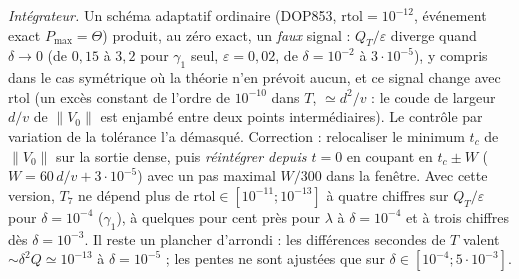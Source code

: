 \documentclass[11pt,a4paper]{article}
\theoremstyle{remark}
\theoremstyle{definition}
\newcommand{\norm}[1]{\lVert #1\rVert}
\newcommand{\eps}{\varepsilon}
\begin{document}
\emph{Intégrateur.} Un schéma adaptatif ordinaire (DOP853, $\mathrm{rtol}=10^{-12}$, événement exact $P_{\max}=\Theta$) produit, au zéro exact, un \emph{faux} signal : $Q_T/\eps$ diverge quand $\delta\to0$ (de $0{,}15$ à $3{,}2$ pour $\gamma_1$ seul, $\eps=0{,}02$, de $\delta=10^{-2}$ à $3\cdot10^{-5}$), y compris dans le cas symétrique où la théorie n'en prévoit aucun, et ce signal change avec $\mathrm{rtol}$ (un excès constant de l'ordre de $10^{-10}$ dans $T$, $\simeq d^2/v$ : le coude de largeur $d/v$ de $\norm{V_0}$ est enjambé entre deux points intermédiaires). Le contrôle par variation de la tolérance l'a démasqué. Correction : relocaliser le minimum $t_c$ de $\norm{V_0}$ sur la sortie dense, puis \emph{réintégrer depuis $t=0$} en coupant en $t_c\pm W$ ($W=60\,d/v+3\cdot10^{-5}$) avec un pas maximal $W/300$ dans la fenêtre. Avec cette version, $T_7$ ne dépend plus de $\mathrm{rtol}\in[10^{-11};10^{-13}]$ à quatre chiffres sur $Q_T/\eps$ pour $\delta=10^{-4}$ ($\gamma_1$), à quelques pour cent près pour $\lambda$ à $\delta=10^{-4}$ et à trois chiffres dès $\delta=10^{-3}$. Il reste un plancher d'arrondi : les différences secondes de $T$ valent $\sim\delta^2Q\simeq10^{-13}$ à $\delta=10^{-5}$ ; les pentes ne sont ajustées que sur $\delta\in[10^{-4};5\cdot10^{-3}]$.
\end{document}
